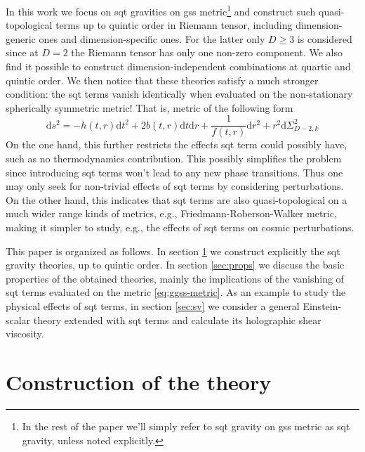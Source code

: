 \documentclass[a4paper,11pt]{article}
\newcommand{\dd}{{\mathrm d}}
\begin{document}
In this work we focus on \ac{sqt} gravities on \ac{gss} metric\footnote{In the rest of the paper we'll simply refer to \ac{sqt} gravity on \ac{gss} metric as \ac{sqt} gravity, unless noted explicitly.} and construct such quasi-topological terms up to quintic order in Riemann tensor, including dimension-generic ones and dimension-specific ones. For the latter only $D \geqslant 3$ is considered since at $D = 2$ the Riemann tensor has only one non-zero component. We also find it possible to construct dimension-independent combinations at quartic and quintic order. We then notice that these theories satisfy a much stronger condition: the \ac{sqt} terms vanish identically when evaluated on the non-stationary spherically symmetric metric! That is, metric of the following form
\begin{equation}\label{eq:ggss-metric}
    \dd s^2 = -h(t, r)\dd t^2 + 2b(t, r)\dd t\dd r + \frac{1}{f(t, r)}\dd r^2 + r^2\dd\Sigma_{D-2,k}^2
\end{equation}
On the one hand, this further restricts the effects \ac{sqt} term could possibly have, such as no thermodynamics contribution. This possibly simplifies the problem since introducing \ac{sqt} terms won't lead to any new phase transitions. Thus one may only seek for non-trivial effects of \ac{sqt} terms by considering perturbations. On the other hand, this indicates that \ac{sqt} terms are also quasi-topological on a much wider range kinds of metrics, e.g., Friedmann-Roberson-Walker metric, making it simpler to study, e.g., the effects of \ac{sqt} terms on cosmic perturbations.

This paper is organized as follows. In section \ref{sec:theory-construct} we construct explicitly the \acl{sqt} gravity theories, up to quintic order. In section \ref{sec:props} we discuss the basic properties of the obtained theories, mainly the implications of the vanishing of \ac{sqt} terms evaluated on the metric \eqref{eq:ggss-metric}. As an example to study the physical effects of \ac{sqt} terms, in section \ref{sec:sv} we consider a general Einstein-scalar theory extended with \ac{sqt} terms and calculate its holographic shear viscosity.

\section{Construction of the theory}
\label{sec:theory-construct}
\end{document}
